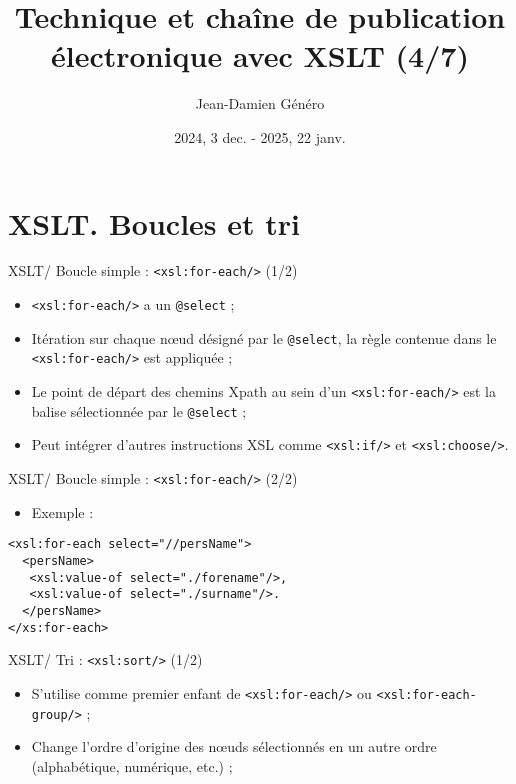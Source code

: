 \documentclass{beamer}
\title{Technique et chaîne de publication électronique avec XSLT (4/7)}
\date{2024, 3 dec. - 2025, 22 janv.}
\author{Jean-Damien Généro}
\institute{École nationale des chartes -- M2 TNAH}
\begin{document}
    \maketitle

    \section{XSLT. Boucles et tri}

    \begin{frame}{XSLT/ Boucle simple : \texttt{<xsl:for-each/>} (1/2)}
        \Large
        \begin{itemize}
            \item \texttt{<xsl:for-each/>} a un \texttt{@select} ;
            \bigskip
            \item Itération sur chaque n\oe ud désigné par le \texttt{@select}, la règle contenue dans le \texttt{<xsl:for-each/>} est appliquée ;
            \bigskip
            \item Le point de départ des chemins Xpath au sein d'un \texttt{<xsl:for-each/>} est la balise sélectionnée par le \texttt{@select} ;
            \bigskip
            \item Peut intégrer d'autres instructions XSL comme \texttt{<xsl:if/>} et \texttt{<xsl:choose/>}.
        \end{itemize}
    \end{frame}

    \begin{frame}[fragile]{XSLT/ Boucle simple : \texttt{<xsl:for-each/>} (2/2)}
        \Large
        \begin{itemize}
            \item Exemple :
        \end{itemize}
        \begin{verbatim}
<xsl:for-each select="//persName">
  <persName>
   <xsl:value-of select="./forename"/>,
   <xsl:value-of select="./surname"/>.
  </persName>
</xs:for-each>
        \end{verbatim}
    \end{frame}

    \begin{frame}{XSLT/ Tri : \texttt{<xsl:sort/>} (1/2)}
        \Large
        \begin{itemize}
            \item S'utilise comme premier enfant de \texttt{<xsl:for-each/>} ou \texttt{<xsl:for-each-group/>} ;
            \bigskip
            \item Change l'ordre d'origine des n\oe uds sélectionnés en un autre ordre (alphabétique, numérique, etc.) ;
        \end{itemize}
    \end{frame}
\end{document}
